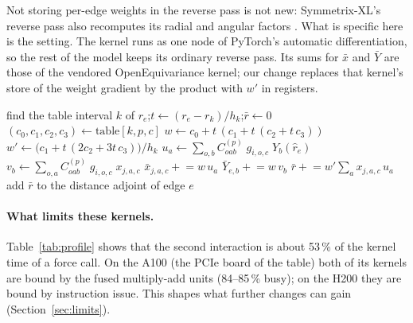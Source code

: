 \documentclass[11pt]{article}
\begin{document}
Not storing per-edge weights in the reverse pass is not new: Symmetrix-XL's reverse pass also recomputes its
radial and angular factors \cite{fu2026symmetrixxl}. What is specific here is the setting. The kernel runs as one
node of PyTorch's automatic differentiation, so the rest of the model keeps its ordinary reverse pass. Its sums
for $\bar x$ and $\bar Y$ are those of the vendored OpenEquivariance kernel; our change replaces that kernel's
store of the weight gradient by the product with $w'$ in registers.

\begin{algorithm}[t]
\caption{Reverse pass of the second interaction for one edge $e = (j \to i)$ and channel $c$. The adjoint $g$ of
the receiver's message is read from a row staged in shared memory.}
\label{alg:reverse}
\begin{algorithmic}[1]
\State find the table interval $k$ of $r_e$;\quad $t \gets (r_e - r_k)/h_k$;\quad $\bar r \gets 0$
  \State $(c_0, c_1, c_2, c_3) \gets \text{table}[k, p, c]$
  \State $w \gets c_0 + t\,(c_1 + t\,(c_2 + t\,c_3))$ 
  \State $w' \gets \bigl(c_1 + t\,(2c_2 + 3t\,c_3)\bigr)/h_k$ 
  \State $u_a \gets \sum_{o,b} C^{(p)}_{oab}\; g_{i,o,c}\; Y_b(\hat r_e)$
  \State $v_b \gets \sum_{o,a} C^{(p)}_{oab}\; g_{i,o,c}\; x_{j,a,c}$
  \State $\bar x_{j,a,c} \mathrel{+}= w\,u_a$ 
  \State $\bar Y_{e,b} \mathrel{+}= w\,v_b$
  \State $\bar r \mathrel{+}= w' \sum_a x_{j,a,c}\,u_a$
\EndFor
\State add $\bar r$ to the distance adjoint of edge $e$
\end{algorithmic}
\end{algorithm}

\paragraph{What limits these kernels.}
Table~\ref{tab:profile} shows that the second interaction is about 53\,\% of the kernel time of a force call. On
the A100 (the PCIe board of the table) both of its kernels are bound by the fused multiply-add units
(84--85\,\% busy); on the H200 they are bound by instruction issue. This shapes what further changes can gain (Section~\ref{sec:limits}).
\end{document}
